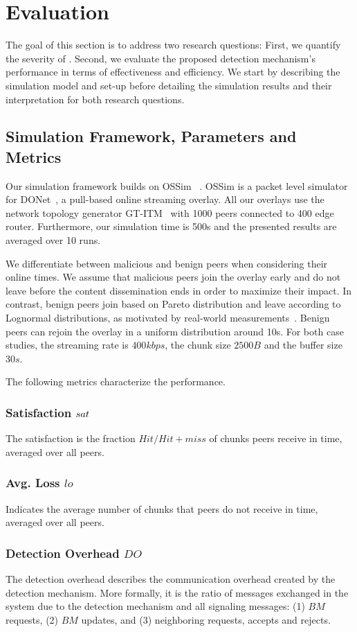 \section{Evaluation}
\label{sec:eval}

The goal of this section is to address two research questions: 
First, we quantify the severity of \drop. 
Second, we evaluate the proposed detection mechanism's performance in terms of effectiveness and efficiency. 
We start by describing the simulation model and set-up before detailing the simulation results and their interpretation for both research questions.


\subsection{Simulation Framework, Parameters and Metrics}
Our simulation framework builds on OSSim ~\cite{nguyen2013ossim}. 
OSSim is a packet level simulator for DONet~\cite{zhang2005coolstreaming}, a pull-based online streaming overlay.
All our overlays use the network topology generator GT-ITM~\cite{GT} with 1000 peers connected to 400 edge router. Furthermore, our simulation time is 500s and the presented results are averaged over 10 runs. 

We differentiate between malicious and benign peers when considering their online times. 
We assume that malicious peers join the overlay early and do not leave before the content dissemination ends in order to maximize their impact. 
In contrast,  benign peers join based on Pareto distribution and leave according to Lognormal distributions, as motivated by real-world measurements~\cite{distribution}.
Benign peers can rejoin the overlay in a uniform distribution around 10s. For both case studies, the streaming rate is $400kbps$, the chunk size $2500B$ and the buffer size $30s$.


The following metrics characterize the performance.
\subsubsection*{Satisfaction $sat$} The satisfaction is the fraction $Hit/Hit+miss$ of chunks peers receive in time, averaged over all peers. 
\subsubsection*{Avg. Loss $lo$} Indicates the average number of chunks that peers do not receive in time, averaged over all peers. 
\subsubsection*{Detection Overhead $DO$} The detection overhead describes the communication overhead created by the detection mechanism. 
More formally, it is the ratio of messages exchanged in the system due to the detection mechanism and all signaling messages: (1) $BM$ requests, (2) $BM$ updates, and (3) neighboring requests, accepts and rejects.
